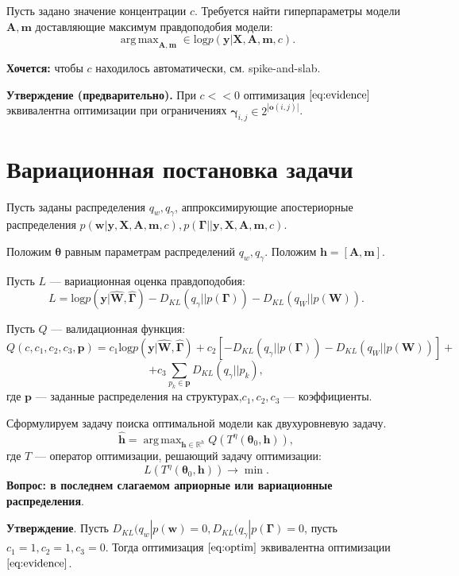 \documentclass[12pt]{article}
\DeclareMathOperator*{\argmax}{arg\,max}
\begin{document}
Пусть задано значение концентрации $c$. 
Требуется найти гиперпараметры модели $\mathbf{A}, \mathbf{m}$ доставляющие максимум правдоподобия модели:
\[
    \argmax_{\mathbf{A}, \mathbf{m}} \in \text{log}p(\mathbf{y}|\mathbf{X},\mathbf{A},\mathbf{m}, c).
\]

\textbf{Хочется: } чтобы $c$ находилось автоматически, см. spike-and-slab.

\textbf{Утверждение (предварительно).} При $c << 0$ оптимизация  $\eqref{eq:evidence}$ эквивалентна оптимизации при ограничениях $\boldsymbol{\gamma}_{i,j} \in 2^{|\mathbf{o}(i,j)|}$.


\section{Вариационная постановка задачи}
Пусть заданы распределения $q_w, q_\gamma$, аппроксимирующие апостериорные распределения $p(\mathbf{w}|\mathbf{y}, \mathbf{X}, \mathbf{A},\mathbf{m}, c), p(\boldsymbol{\Gamma}| |\mathbf{y}, \mathbf{X}, \mathbf{A},\mathbf{m}, c).$

Положим $\boldsymbol{\theta}$ равным параметрам распределений $q_w, q_\gamma$. 
Положим $\mathbf{h} = [\mathbf{A}, \mathbf{m}].$

Пусть $L$ --- вариационная оценка правдоподобия:
\[
    L = \text{log} p(\mathbf{y}|\hat{\mathbf{W}}, \hat{\boldsymbol{\Gamma}}) - {D_{KL}}(q_\gamma||p(\boldsymbol{\Gamma})) - {D_{KL}}(q_{W}||p(\mathbf{W})).
\]

Пусть $Q$ --- валидационная функция:
\[
    Q(c, c_1, c_2, c_3, \mathbf{p}) = c_1\text{log} p(\mathbf{y}|\hat{\mathbf{W}}, \hat{\boldsymbol{\Gamma}}) + c_2[-{D_{KL}}(q_\gamma||p(\boldsymbol{\Gamma})) - {D_{KL}}(q_{W}||p(\mathbf{W}))] + 
\]
\[
    + c_3\sum_{p_k \in \mathbf{p}}{D_{KL}}(q_\gamma||p_k),
\]
где $\mathbf{p}$ --- заданные распределения на структурах,$c_1,c_2,c_3$ --- коэффициенты.

Сформулируем задачу поиска оптимальной модели как двухуровневую задачу.
\begin{equation}
\label{eq:optim}
	\hat{\mathbf{h}} = \argmax_{\mathbf{h} \in \mathbb{R}^h} Q( T^\eta(\boldsymbol{\theta}_0, \mathbf{h})),
\end{equation}
где $T$ --- оператор оптимизации, решающий задачу оптимизации:
\[
    L(T^\eta(\boldsymbol{\theta}_0, \mathbf{h})) \to \min.
\]
\textbf{Вопрос: в последнем слагаемом априорные или вариационные распределения}.

\textbf{Утверждение}. Пусть $D_{KL}(q_w|p(\mathbf{w}) = 0, D_{KL}(q_\gamma|p(\boldsymbol{\Gamma}) = 0$, пусть $c_1 = 1, c_2 = 1, c_3 = 0$. Тогда оптимизация $\eqref{eq:optim}$ эквивалентна оптимизации $\eqref{eq:evidence}$.
\end{document}
